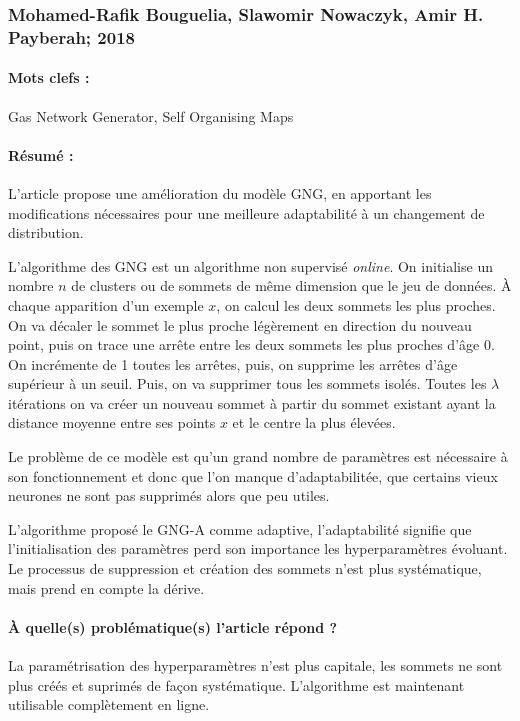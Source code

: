 \documentclass[11pt,a4paper]{report}
\begin{document}
\subsubsection{Mohamed-Rafik Bouguelia, Slawomir Nowaczyk, Amir H. Payberah; 2018}

\paragraph{Mots clefs :}Gas Network Generator, Self Organising Maps

\paragraph{Résumé :}L'article propose une amélioration du modèle GNG, en apportant les modifications nécessaires pour une meilleure adaptabilité à un changement de distribution.

L'algorithme des GNG est un algorithme non supervisé \textit{online}. On initialise un nombre $n$ de clusters ou de sommets de même dimension que le jeu de données. À chaque apparition d'un exemple $x$, on calcul les deux sommets les plus proches. On va décaler le sommet le plus proche légèrement en direction du nouveau point, puis on trace une arrête entre les deux sommets les plus proches d'âge 0. On incrémente de 1 toutes les arrêtes, puis, on supprime les arrêtes d'âge supérieur à un seuil. Puis, on va supprimer tous les sommets isolés. Toutes les $\lambda$ itérations on va créer un nouveau sommet à partir du sommet existant ayant la distance moyenne entre ses points $x$ et le centre la plus élevées.

Le problème de ce modèle est qu'un grand nombre de paramètres est nécessaire à son fonctionnement et donc que l'on manque d'adaptabilitée, que certains vieux neurones ne sont pas supprimés alors que peu utiles.

L'algorithme proposé le GNG-A comme adaptive, l'adaptabilité signifie que l'initialisation des paramètres perd son importance les hyperparamètres évoluant. Le processus de suppression et création des sommets n'est plus systématique, mais prend en compte la dérive. 

\paragraph{À quelle(s) problématique(s) l'article répond ? } La paramétrisation des hyperparamètres n'est plus capitale, les sommets ne sont plus créés et suprimés de façon systématique. L'algorithme est maintenant utilisable complètement en ligne.
\end{document}
